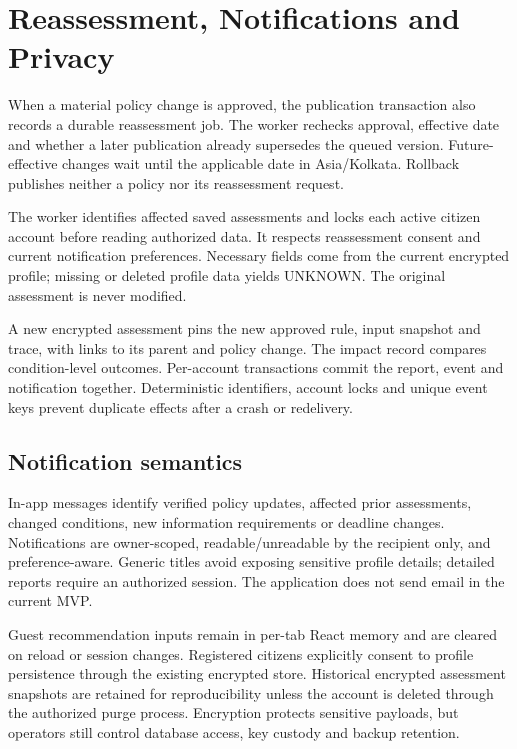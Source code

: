 \documentclass[12pt,a4paper,twoside]{report}
\begin{document}
\section{Reassessment, Notifications and Privacy}

When a material policy change is approved, the publication transaction also records a durable reassessment job. The worker rechecks approval, effective date and whether a later publication already supersedes the queued version. Future-effective changes wait until the applicable date in Asia/Kolkata. Rollback publishes neither a policy nor its reassessment request.

The worker identifies affected saved assessments and locks each active citizen account before reading authorized data. It respects reassessment consent and current notification preferences. Necessary fields come from the current encrypted profile; missing or deleted profile data yields UNKNOWN. The original assessment is never modified.

A new encrypted assessment pins the new approved rule, input snapshot and trace, with links to its parent and policy change. The impact record compares condition-level outcomes. Per-account transactions commit the report, event and notification together. Deterministic identifiers, account locks and unique event keys prevent duplicate effects after a crash or redelivery.

\subsection*{Notification semantics}

In-app messages identify verified policy updates, affected prior assessments, changed conditions, new information requirements or deadline changes. Notifications are owner-scoped, readable/unreadable by the recipient only, and preference-aware. Generic titles avoid exposing sensitive profile details; detailed reports require an authorized session. The application does not send email in the current MVP.

Guest recommendation inputs remain in per-tab React memory and are cleared on reload or session changes. Registered citizens explicitly consent to profile persistence through the existing encrypted store. Historical encrypted assessment snapshots are retained for reproducibility unless the account is deleted through the authorized purge process. Encryption protects sensitive payloads, but operators still control database access, key custody and backup retention.
\end{document}
